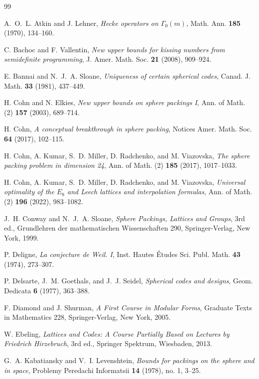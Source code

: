 \documentclass[11pt,reqno]{amsart}
\theoremstyle{plain}
\theoremstyle{definition}
\theoremstyle{remark}
\begin{document}
\begin{thebibliography}{99}

A.~O.~L. Atkin and J. Lehner,
\emph{Hecke operators on $\Gamma_0(m)$},
Math. Ann. \textbf{185} (1970), 134--160.

C. Bachoc and F. Vallentin,
\emph{New upper bounds for kissing numbers from semidefinite
programming},
J. Amer. Math. Soc. \textbf{21} (2008), 909--924.

E. Bannai and N.~J.~A. Sloane,
\emph{Uniqueness of certain spherical codes},
Canad. J. Math. \textbf{33} (1981), 437--449.

H. Cohn and N. Elkies,
\emph{New upper bounds on sphere packings I},
Ann. of Math. (2) \textbf{157} (2003), 689--714.

H. Cohn,
\emph{A conceptual breakthrough in sphere packing},
Notices Amer. Math. Soc. \textbf{64} (2017), 102--115.

H. Cohn, A. Kumar, S.~D. Miller, D. Radchenko, and M. Viazovska,
\emph{The sphere packing problem in dimension 24},
Ann. of Math. (2) \textbf{185} (2017), 1017--1033.

H. Cohn, A. Kumar, S.~D. Miller, D. Radchenko, and M. Viazovska,
\emph{Universal optimality of the $E_8$ and Leech lattices and
interpolation formulas},
Ann. of Math. (2) \textbf{196} (2022), 983--1082.

J.~H. Conway and N.~J.~A. Sloane,
\emph{Sphere Packings, Lattices and Groups},
3rd ed., Grundlehren der mathematischen Wissenschaften 290,
Springer-Verlag, New York, 1999.

P. Deligne,
\emph{La conjecture de Weil. I},
Inst. Hautes \'Etudes Sci. Publ. Math. \textbf{43} (1974), 273--307.

P. Delsarte, J.~M. Goethals, and J.~J. Seidel,
\emph{Spherical codes and designs},
Geom. Dedicata \textbf{6} (1977), 363--388.

F. Diamond and J. Shurman,
\emph{A First Course in Modular Forms},
Graduate Texts in Mathematics 228, Springer-Verlag, New York, 2005.

W. Ebeling,
\emph{Lattices and Codes: A Course Partially Based on Lectures by
Friedrich Hirzebruch},
3rd ed., Springer Spektrum, Wiesbaden, 2013.

G.~A. Kabatiansky and V.~I. Levenshtein,
\emph{Bounds for packings on the sphere and in space},
Problemy Peredachi Informatsii \textbf{14} (1978), no. 1, 3--25.


\end{thebibliography}
\end{document}
